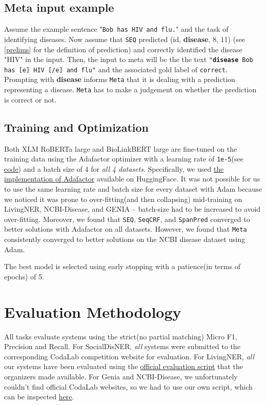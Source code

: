 \documentclass[11pt]{article}
\begin{document}
\subsection{Meta input example}\label{meta-example}
Assume the example sentence "\texttt{Bob has HIV and flu.}" and the task of identifying diseases. Now assume that \texttt{SEQ} predicted \newline (id, \textbf{disease}, 8, 11) (see \autoref{prelims} for the definition of prediction) and correctly identified the disease "HIV" in the input. Then, the input to meta will be the the text \texttt{"\textbf{disease} Bob has [e] HIV [/e] and flu"} and the associated gold label of \texttt{correct}. Prompting with \textbf{disease} informs \texttt{Meta} that it is dealing with a prediction representing a disease. \texttt{Meta} has to make a judgement on whether the prediction is correct or not. 

\subsection{Training and Optimization} 
Both XLM RoBERTa large\cite{xlm} and BioLinkBERT large\cite{yasunaga-etal-2022-linkbert} are fine-tuned on the training data using the Adafactor\cite{adafactor} optimizer with a learning rate of \verb|1e-5|(see \href{https://github.com/flyingmothman/bionlp/blob/d61b02593711b43b5d0f00f0c6ed62fb7685adf3/utils/training.py#L13-L20}{code}) and a batch size of 4 for \textit{all 4 datasets}. Specifically, we used \href{https://huggingface.co/docs/transformers/main_classes/optimizer_schedules#transformers.Adafactor}{the implementation of Adafactor} available on HuggingFace\cite{hugging}. It was not possible for us to use the same learning rate and batch size for every dataset with Adam\cite{adam} because we noticed it was prone to over-fitting(and then collapsing) mid-training on LivingNER, NCBI-Disease, and GENIA -- batch-size had to be increased to avoid over-fitting. Moreover, we found that \texttt{SEQ}, \texttt{SeqCRF}, and \texttt{SpanPred} converged to better solutions with Adafactor on all datasets. However, we found that \texttt{Meta} consistently converged to better solutions on the NCBI disease dataset using Adam. \par The best model is selected using early stopping with a patience(in terms of epochs) of 5. 

\section{Evaluation Methodology}
All tasks evaluate systems using the strict(no partial matching) Micro F1, Precision and Recall. For SocialDisNER, \textit{all} systems were submitted to the corresponding CodaLab\cite{pavao2022codalab} competition website for evaluation. For LivingNER, \textit{all} our systems have been evaluated using the \href{https://temu.bsc.es/livingner/2022/01/28/evaluation/}{official evaluation script} that the organizers made available. For Genia and NCBI-Disease, we unfortunately couldn't find official CodaLab websites, so we had to use our own script, which can be inspected \href{https://github.com/flyingmothman/bionlp}{here}.
\end{document}
